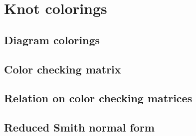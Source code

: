 \section{Knot colorings}

\subsection{Diagram colorings}



\subsection{Color checking matrix}



\subsection{Relation on color checking matrices}



\subsection{Reduced Smith normal form}

 
